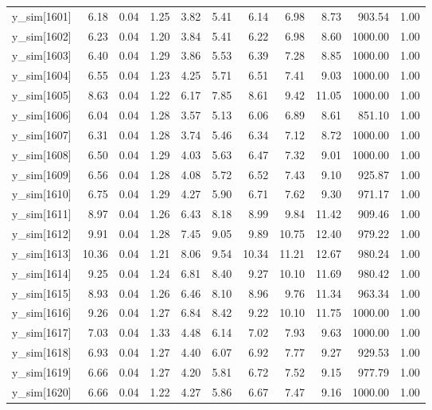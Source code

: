 \begin{table}[ht]
\begin{tabular}{rrrrrrrrrrr}
  y\_sim[1601] & 6.18 & 0.04 & 1.25 & 3.82 & 5.41 & 6.14 & 6.98 & 8.73 & 903.54 & 1.00 \\ 
  y\_sim[1602] & 6.23 & 0.04 & 1.20 & 3.84 & 5.41 & 6.22 & 6.98 & 8.60 & 1000.00 & 1.00 \\ 
  y\_sim[1603] & 6.40 & 0.04 & 1.29 & 3.86 & 5.53 & 6.39 & 7.28 & 8.85 & 1000.00 & 1.00 \\ 
  y\_sim[1604] & 6.55 & 0.04 & 1.23 & 4.25 & 5.71 & 6.51 & 7.41 & 9.03 & 1000.00 & 1.00 \\ 
  y\_sim[1605] & 8.63 & 0.04 & 1.22 & 6.17 & 7.85 & 8.61 & 9.42 & 11.05 & 1000.00 & 1.00 \\ 
  y\_sim[1606] & 6.04 & 0.04 & 1.28 & 3.57 & 5.13 & 6.06 & 6.89 & 8.61 & 851.10 & 1.00 \\ 
  y\_sim[1607] & 6.31 & 0.04 & 1.28 & 3.74 & 5.46 & 6.34 & 7.12 & 8.72 & 1000.00 & 1.00 \\ 
  y\_sim[1608] & 6.50 & 0.04 & 1.29 & 4.03 & 5.63 & 6.47 & 7.32 & 9.01 & 1000.00 & 1.00 \\ 
  y\_sim[1609] & 6.56 & 0.04 & 1.28 & 4.08 & 5.72 & 6.52 & 7.43 & 9.10 & 925.87 & 1.00 \\ 
  y\_sim[1610] & 6.75 & 0.04 & 1.29 & 4.27 & 5.90 & 6.71 & 7.62 & 9.30 & 971.17 & 1.00 \\ 
  y\_sim[1611] & 8.97 & 0.04 & 1.26 & 6.43 & 8.18 & 8.99 & 9.84 & 11.42 & 909.46 & 1.00 \\ 
  y\_sim[1612] & 9.91 & 0.04 & 1.28 & 7.45 & 9.05 & 9.89 & 10.75 & 12.40 & 979.22 & 1.00 \\ 
  y\_sim[1613] & 10.36 & 0.04 & 1.21 & 8.06 & 9.54 & 10.34 & 11.21 & 12.67 & 980.24 & 1.00 \\ 
  y\_sim[1614] & 9.25 & 0.04 & 1.24 & 6.81 & 8.40 & 9.27 & 10.10 & 11.69 & 980.42 & 1.00 \\ 
  y\_sim[1615] & 8.93 & 0.04 & 1.26 & 6.46 & 8.10 & 8.96 & 9.76 & 11.34 & 963.34 & 1.00 \\ 
  y\_sim[1616] & 9.26 & 0.04 & 1.27 & 6.84 & 8.42 & 9.22 & 10.10 & 11.75 & 1000.00 & 1.00 \\ 
  y\_sim[1617] & 7.03 & 0.04 & 1.33 & 4.48 & 6.14 & 7.02 & 7.93 & 9.63 & 1000.00 & 1.00 \\ 
  y\_sim[1618] & 6.93 & 0.04 & 1.27 & 4.40 & 6.07 & 6.92 & 7.77 & 9.27 & 929.53 & 1.00 \\ 
  y\_sim[1619] & 6.66 & 0.04 & 1.27 & 4.20 & 5.81 & 6.72 & 7.52 & 9.15 & 977.79 & 1.00 \\ 
  y\_sim[1620] & 6.66 & 0.04 & 1.22 & 4.27 & 5.86 & 6.67 & 7.47 & 9.16 & 1000.00 & 1.00 \\ 

\end{tabular}
\end{table}
